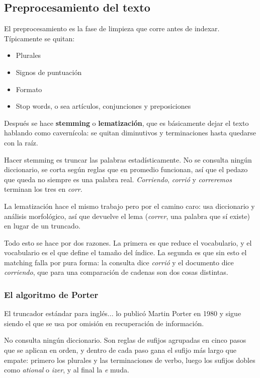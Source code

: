 \documentclass[11pt,letterpaper]{article}
\begin{document}
\subsection*{Preprocesamiento del texto}

El preprocesamiento es la fase de limpieza que corre antes de indexar.
Típicamente se quitan:

\begin{itemize}
    \item Plurales
    \item Signos de puntuación
    \item Formato
    \item Stop words, o sea artículos, conjunciones y preposiciones
\end{itemize}

Después se hace \textbf{stemming} o \textbf{lematización}, que es
básicamente dejar el texto hablando como cavernícola: se quitan
diminutivos y terminaciones hasta quedarse con la raíz.

\begin{idea}
    Hacer stemming es truncar las palabras estadísticamente. No se
    consulta ningún diccionario, se corta según reglas que en promedio
    funcionan, así que el pedazo que queda no siempre es una palabra
    real. \textit{Corriendo}, \textit{corrió} y \textit{correremos}
    terminan los tres en \textit{corr}.
\end{idea}

La lematización hace el mismo trabajo pero por el camino caro: usa
diccionario y análisis morfológico, así que devuelve el lema
(\textit{correr}, una palabra que sí existe) en lugar de un truncado.

Todo esto se hace por dos razones. La primera es que reduce el
vocabulario, y el vocabulario es el que define el tamaño del índice.
La segunda es que sin esto el matching falla por pura forma: la
consulta dice \textit{corrió} y el documento dice \textit{corriendo},
que para una comparación de cadenas son dos cosas distintas.

\subsubsection*{El algoritmo de Porter}

El truncador estándar para inglés... lo
publicó Martin Porter en 1980 y sigue siendo el que se usa por omisión
en recuperación de información.

No consulta ningún diccionario. Son reglas de sufijos agrupadas en
cinco pasos que se aplican en orden, y dentro de cada paso gana el
sufijo más largo que empate: primero los plurales y las terminaciones
de verbo, luego los sufijos dobles como \textit{ational} o
\textit{izer}, y al final la \textit{e} muda.
\end{document}
